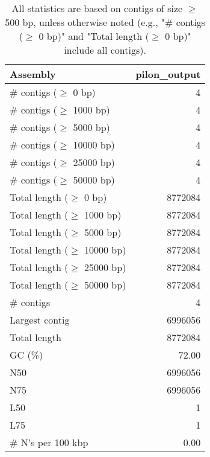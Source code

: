 \documentclass[12pt,a4paper]{article}
\begin{document}
\begin{table}[ht]
\begin{center}
\caption{All statistics are based on contigs of size $\geq$ 500 bp, unless otherwise noted (e.g., "\# contigs ($\geq$ 0 bp)" and "Total length ($\geq$ 0 bp)" include all contigs).}
\begin{tabular}{|l*{1}{|r}|}
\hline
Assembly & pilon\_output \\ \hline
\# contigs ($\geq$ 0 bp) & 4 \\ \hline
\# contigs ($\geq$ 1000 bp) & 4 \\ \hline
\# contigs ($\geq$ 5000 bp) & 4 \\ \hline
\# contigs ($\geq$ 10000 bp) & 4 \\ \hline
\# contigs ($\geq$ 25000 bp) & 4 \\ \hline
\# contigs ($\geq$ 50000 bp) & 4 \\ \hline
Total length ($\geq$ 0 bp) & 8772084 \\ \hline
Total length ($\geq$ 1000 bp) & 8772084 \\ \hline
Total length ($\geq$ 5000 bp) & 8772084 \\ \hline
Total length ($\geq$ 10000 bp) & 8772084 \\ \hline
Total length ($\geq$ 25000 bp) & 8772084 \\ \hline
Total length ($\geq$ 50000 bp) & 8772084 \\ \hline
\# contigs & 4 \\ \hline
Largest contig & 6996056 \\ \hline
Total length & 8772084 \\ \hline
GC (\%) & 72.00 \\ \hline
N50 & 6996056 \\ \hline
N75 & 6996056 \\ \hline
L50 & 1 \\ \hline
L75 & 1 \\ \hline
\# N's per 100 kbp & 0.00 \\ \hline
\end{tabular}
\end{center}
\end{table}
\end{document}
